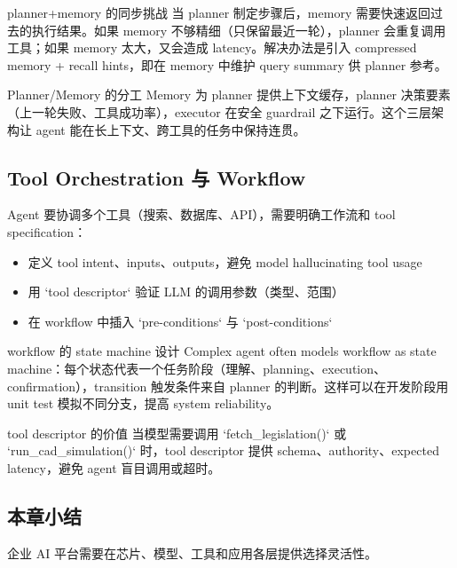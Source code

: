 \begin{importantbox}{planner+memory 的同步挑战}
当 planner 制定步骤后，memory 需要快速返回过去的执行结果。如果 memory 不够精细（只保留最近一轮），planner 会重复调用工具；如果 memory 太大，又会造成 latency。解决办法是引入 compressed memory + recall hints，即在 memory 中维护 query summary 供 planner 参考。
\end{importantbox}
\begin{importantbox}{Planner/Memory 的分工}
Memory 为 planner 提供上下文缓存，planner 决策要素（上一轮失败、工具成功率），executor 在安全 guardrail 之下运行。这个三层架构让 agent 能在长上下文、跨工具的任务中保持连贯。
\end{importantbox}

\subsection{Tool Orchestration 与 Workflow}

Agent 要协调多个工具（搜索、数据库、API），需要明确工作流和 tool specification：

\begin{itemize}
    \item 定义 tool intent、inputs、outputs，避免 model hallucinating tool usage
    \item 用 `tool descriptor` 验证 LLM 的调用参数（类型、范围）
    \item 在 workflow 中插入 `pre-conditions` 与 `post-conditions`
\end{itemize}

\begin{knowledgebox}{workflow 的 state machine 设计}
Complex agent often models workflow as state machine：每个状态代表一个任务阶段（理解、planning、execution、confirmation），transition 触发条件来自 planner 的判断。这样可以在开发阶段用 unit test 模拟不同分支，提高 system reliability。
\end{knowledgebox}
\begin{knowledgebox}{tool descriptor 的价值}
当模型需要调用 `fetch\_legislation()` 或 `run\_cad\_simulation()` 时，tool descriptor 提供 schema、authority、expected latency，避免 agent 盲目调用或超时。
\end{knowledgebox}

\subsection{本章小结}

企业 AI 平台需要在芯片、模型、工具和应用各层提供选择灵活性。

